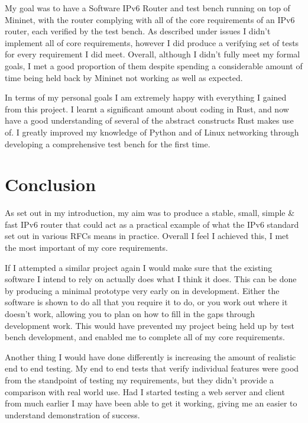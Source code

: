 \documentclass[12pt,a4paper,twoside,openright]{report}
\begin{document}
My goal was to have a Software IPv6 Router and test bench running on top of Mininet, with the router complying with all of the core requirements of an IPv6 router, each verified by the test bench.  As described under issues I didn't implement all of core requirements, however I did produce a verifying set of tests for every requirement I did meet.  Overall, although I didn't fully meet my formal goals, I met a good proportion of them despite spending a considerable amount of time being held back by Mininet not working as well as expected.

\bigskip

In terms of my personal goals I am extremely happy with everything I gained from this project.  I learnt a significant amount about coding in Rust, and now have a good understanding of several of the abstract constructs Rust makes use of.  I greatly improved my knowledge of Python and of Linux networking through developing a comprehensive test bench for the first time.


\chapter{Conclusion}

As set out in my introduction, my aim was to produce a stable, small, simple \& fast IPv6 router that could act as a practical example of what the IPv6 standard set out in various RFCs means in practice.  Overall I feel I achieved this, I met the most important of my core requirements.

\bigskip

If I attempted a similar project again I would make sure that the existing software I intend to rely on actually does what I think it does.  This can be done by producing a minimal prototype very early on in development.  Either the software is shown to do all that you require it to do, or you work out where it doesn't work, allowing you to plan on how to fill in the gaps through development work.  This would have prevented my project being held up by test bench development, and enabled me to complete all of my core requirements.

\bigskip

Another thing I would have done differently is increasing the amount of realistic end to end testing.  My end to end tests that verify individual features were good from the standpoint of testing my requirements, but they didn't provide a comparison with real world use.  Had I started testing a web server and client from much earlier I may have been able to get it working, giving me an easier to understand demonstration of success.
\end{document}
